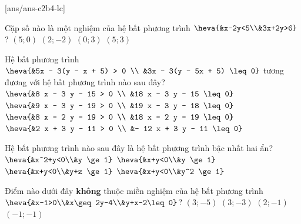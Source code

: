 \baitaptn
 
\setcounter{ex}{0}
[ans/ans-c2b4-lc]
\begin{ex}%
	Cặp số nào là một nghiệm của hệ bất phương trình $\heva{&x-2y<5\\&3x+2y>6}$?
	\choice
	{$(5;0)$}
	{$(2;-2)$}
	{$(0;3)$}
	{\True $(5;3)$}
\end{ex}
\begin{ex}%
	Hệ bất phương trình $\heva{&5x - 3(y - x + 5) > 0 \\ &3x - 3(y - 5x + 5) \leq 0}$ tương đương với hệ bất phương trình nào sau đây?
	\choice
	{\True $\heva{&8 x - 3 y - 15 > 0 \\ &18 x - 3 y - 15 \leq 0}$}
	{$ \heva{&9 x - 3 y - 19 > 0 \\ &19 x - 3 y - 18 \leq 0} $}
	{$ \heva{&8 x - 2 y - 19 > 0 \\ &18 x - 2 y - 19 \leq 0} $}
	{$ \heva{&2 x + 3 y - 11 > 0 \\ &- 12 x + 3 y - 11 \leq 0} $}
\end{ex}
\begin{ex}%
	Hệ bất phương trình nào sau đây là hệ bất phương trình bậc nhất hai ẩn?
	\choice
	{$\heva{&x^2+y<0\\&y \ge 1}$}
	{\True $\heva{&x+y<0\\&y \ge 1}$}
	{$\heva{&x+y<0\\&y+z \ge 1}$}
	{$\heva{&x+y<0\\&y^2 \ge 1}$}
\end{ex}
\begin{ex}%
	Điểm nào dưới đây \textbf{không} thuộc miền nghiệm của hệ bất phương trình $\heva{&x-1>0\\&x\geq 2y-4\\&y+x-2\leq 0}$?
	\choice
	{$(3;-5)$}
	{$(3;-3)$}
	{$(2;-1)$}
	{\True $(-1;-1)$}
\end{ex}
